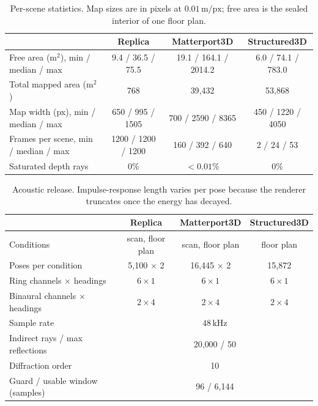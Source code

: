 \begin{table}[t]
\centering
\caption{Per-scene statistics. Map sizes are in pixels at $0.01\,\mathrm{m/px}$;
free area is the sealed interior of one floor plan.}
\label{tab:supp-stats}
\small
\begin{tabular}{lccc}
\toprule
 & Replica & Matterport3D & Structured3D \\
\midrule
Free area (m$^2$), min / median / max & 9.4 / 36.5 / 75.5 & 19.1 / 164.1 / 2014.2 & 6.0 / 74.1 / 783.0 \\
Total mapped area (m$^2$)             & 768 & 39{,}432 & 53{,}868 \\
Map width (px), min / median / max    & 650 / 995 / 1505 & 700 / 2590 / 8365 & 450 / 1220 / 4050 \\
Frames per scene, min / median / max  & 1200 / 1200 / 1200 & 160 / 392 / 640 & 2 / 24 / 53 \\
Saturated depth rays                  & $0\%$ & $<0.01\%$ & $0\%$ \\
\bottomrule
\end{tabular}
\end{table}

\begin{table}[t]
\centering
\caption{Acoustic release. Impulse-response length varies per pose because the
renderer truncates once the energy has decayed.}
\label{tab:supp-acoustic}
\small
\begin{tabular}{lccc}
\toprule
 & Replica & Matterport3D & Structured3D \\
\midrule
Conditions                       & scan, floor plan & scan, floor plan & floor plan \\
Poses per condition              & 5{,}100 $\times$ 2 & 16{,}445 $\times$ 2 & 15{,}872 \\
Ring channels $\times$ headings  & $6 \times 1$ & $6 \times 1$ & $6 \times 1$ \\
Binaural channels $\times$ headings & $2 \times 4$ & $2 \times 4$ & $2 \times 4$ \\
Sample rate                      & \multicolumn{3}{c}{$48\,\mathrm{kHz}$} \\
Indirect rays / max reflections  & \multicolumn{3}{c}{20{,}000 / 50} \\
Diffraction order                & \multicolumn{3}{c}{10} \\
Guard / usable window (samples)  & \multicolumn{3}{c}{96 / 6{,}144} \\
\bottomrule
\end{tabular}
\end{table}

